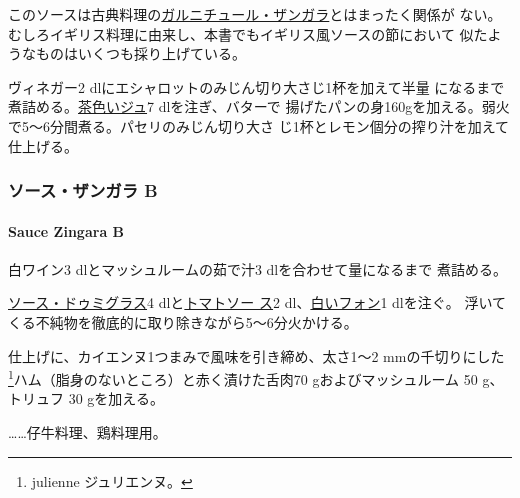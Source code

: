 \begin{recette}
このソースは古典料理の\protect\hyperlink{}{ガルニチュール・ザンガラ}とはまったく関係が
ない。むしろイギリス料理に由来し、本書でもイギリス風ソースの節において
似たようなものはいくつも採り上げている。

ヴィネガー2\undemi{} dlにエシャロットのみじん切り大さじ1杯を加えて半量
になるまで煮詰める。\protect\hyperlink{jus-de-veau-lie}{茶色いジュ}7
dlを注ぎ、バターで
揚げたパンの身160gを加える。弱火で5〜6分間煮る。パセリのみじん切り大さ
じ1杯とレモン\undemi{}個分の搾り汁を加えて仕上げる。

\maeaki

\hypertarget{ux30bdux30fcux30b9ux30b6ux30f3ux30acux30e9-b}{%
\subsubsection{ソース・ザンガラ
B}\label{ux30bdux30fcux30b9ux30b6ux30f3ux30acux30e9-b}}

\hypertarget{sauce-zingara-b}{%
\paragraph{Sauce Zingara B}\label{sauce-zingara-b}}


白ワイン3 dlとマッシュルームの茹で汁3 dlを合わせて\untiers{}量になるまで
煮詰める。

\protect\hyperlink{sauce-demi-glace}{ソース・ドゥミグラス}4
dlと\protect\hyperlink{sauce-tomate}{トマトソー ス}2\undemi{}
dl、\protect\hyperlink{fonds-blanc}{白いフォン}1 dlを注ぐ。
浮いてくる不純物を徹底的に取り除きながら5〜6分火かける。

仕上げに、カイエンヌ1つまみで風味を引き締め、太さ1〜2 mmの千切りにした
\footnote{julienne ジュリエンヌ。}ハム（脂身のないところ）と赤く漬けた舌肉70
gおよびマッシュルーム 50 g、トリュフ 30 gを加える。

\ldots{}\ldots{}仔牛料理、鶏料理用。
\end{recette}